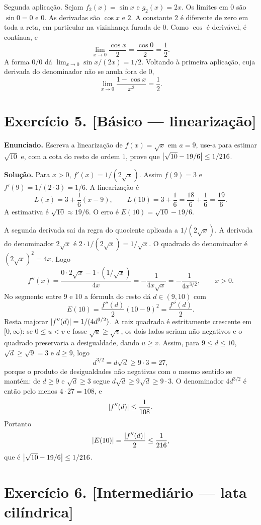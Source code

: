 \documentclass[11pt,a4paper]{article}
\begin{document}
Segunda aplicação. Sejam $f_2(x)=\sin x$ e $g_2(x)=2x$. Os limites em $0$ são $\sin 0=0$ e $0$. As derivadas são $\cos x$ e $2$. A constante $2$ é diferente de zero em toda a reta, em particular na vizinhança furada de $0$. Como $\cos$ é derivável, é contínua, e
\[
\lim_{x\to 0}\frac{\cos x}{2}=\frac{\cos 0}{2}=\frac{1}{2}.
\]
A forma $0/0$ dá $\lim_{x\to 0}\sin x/(2x)=1/2$. Voltando à primeira aplicação, cuja derivada do denominador não se anula fora de $0$,
\[
\lim_{x\to 0}\frac{1-\cos x}{x^2}=\frac12.
\]

\section*{Exercício 5. [Básico --- linearização]}

\textbf{Enunciado.} Escreva a linearização de $f(x)=\sqrt{x}$ em $a=9$, use-a para estimar $\sqrt{10}$ e, com a cota do resto de ordem $1$, prove que $\left\lvert \sqrt{10}-19/6 \right\rvert\le 1/216$.

\textbf{Solução.}
Para $x>0$, $f'(x)=1/(2\sqrt{x})$. Assim $f(9)=3$ e $f'(9)=1/(2\cdot 3)=1/6$. A linearização é
\[
L(x)=3+\frac{1}{6}(x-9),\qquad L(10)=3+\frac16=\frac{18}{6}+\frac{1}{6}=\frac{19}{6}.
\]
A estimativa é $\sqrt{10}\approx 19/6$. O erro é $E(10)=\sqrt{10}-19/6$.

A segunda derivada sai da regra do quociente aplicada a $1/(2\sqrt{x})$. A derivada do denominador $2\sqrt{x}$ é $2\cdot 1/(2\sqrt{x})=1/\sqrt{x}$. O quadrado do denominador é $(2\sqrt{x})^2=4x$. Logo
\[
f''(x)=\frac{0\cdot 2\sqrt{x}-1\cdot(1/\sqrt{x})}{4x}=-\frac{1}{4x\sqrt{x}}=-\frac{1}{4x^{3/2}},\qquad x>0.
\]
No segmento entre $9$ e $10$ a fórmula do resto dá $d\in(9,10)$ com
\[
E(10)=\frac{f''(d)}{2}(10-9)^2=\frac{f''(d)}{2}.
\]
Resta majorar $\left\lvert f''(d) \right\rvert=1/(4d^{3/2})$. A raiz quadrada é estritamente crescente em $[0,\infty)$: se $0\le u<v$ e fosse $\sqrt{u}\ge\sqrt{v}$, os dois lados seriam não negativos e o quadrado preservaria a desigualdade, dando $u\ge v$. Assim, para $9\le d\le 10$, $\sqrt{d}\ge\sqrt{9}=3$ e $d\ge 9$, logo
\[
d^{3/2}=d\sqrt{d}\ge 9\cdot 3=27,
\]
porque o produto de desigualdades não negativas com o mesmo sentido se mantém: de $d\ge 9$ e $\sqrt{d}\ge 3$ segue $d\sqrt{d}\ge 9\sqrt{d}\ge 9\cdot 3$. O denominador $4d^{3/2}$ é então pelo menos $4\cdot 27=108$, e
\[
\left\lvert f''(d) \right\rvert\le\frac{1}{108}.
\]
Portanto
\[
\left\lvert E(10) \right\rvert=\frac{\left\lvert f''(d) \right\rvert}{2}\le\frac{1}{216},
\]
que é $\left\lvert \sqrt{10}-19/6 \right\rvert\le 1/216$.

\section*{Exercício 6. [Intermediário --- lata cilíndrica]}
\end{document}
